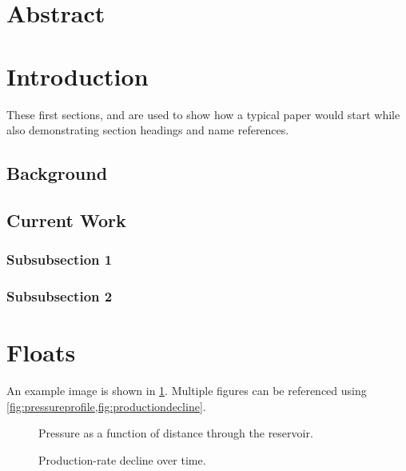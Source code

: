 \documentclass[conference]{spe}
\begin{document}
\spemaketitle{}

\section{Abstract}
\label{sec:abstract}
\lipsum[1-2]{}

\section{Introduction}
\label{sec:introduction}
These first sections,  and  are used to show how a typical paper would start while also demonstrating section headings and name references.

\subsection{Background}
\lipsum[3-4]{}

\subsection{Current Work}
\lipsum[5][1-5]{}

\subsubsection{Subsubsection 1}
\lipsum[6][1-5]{}

\subsubsection{Subsubsection 2}
\lipsum[7][1-8]{}

\section{Floats}
An example image is shown in \cref{fig:pressureprofile}. Multiple figures can be referenced using \cref{fig:pressureprofile,fig:productiondecline}.

\begin{figure}[htbp]
    \centering
    \caption{Pressure as a function of distance through the reservoir.}
    \label{fig:pressureprofile}
\end{figure}
\begin{figure}[htbp]
    \centering
    \caption{Production-rate decline over time.}
    \label{fig:productiondecline}
\end{figure}
\end{document}
